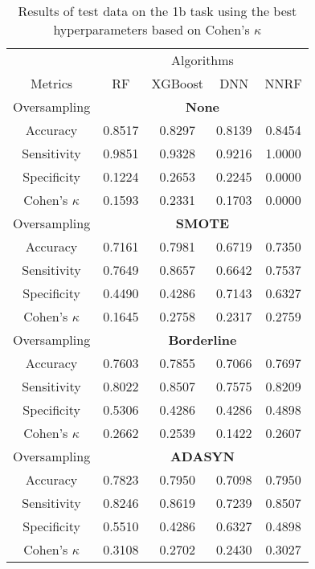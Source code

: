 \begin{table}[!htb]
\centering
\caption{Results of test data on the 1b task using the best hyperparameters based on Cohen's $\kappa$}
\label{tab:1b_test_results}
\begin{tabular}{c | c c c c}
\hline
 & \multicolumn{4}{c}{Algorithms}\\ 
Metrics &RF & XGBoost & DNN & NNRF\\ 
\hline
Oversampling &\multicolumn{4}{|c}{\textbf{None}}\\ 
\hline
Accuracy & 0.8517 & 0.8297 & 0.8139 & 0.8454\\ 
Sensitivity & 0.9851 & 0.9328 & 0.9216 & 1.0000\\ 
Specificity & 0.1224 & 0.2653 & 0.2245 & 0.0000\\ 
Cohen's $\kappa$ & 0.1593 & 0.2331 & 0.1703 & 0.0000\\ 
\hline
Oversampling &\multicolumn{4}{|c}{\textbf{SMOTE}}\\ 
\hline
Accuracy & 0.7161 & 0.7981 & 0.6719 & 0.7350\\ 
Sensitivity & 0.7649 & 0.8657 & 0.6642 & 0.7537\\ 
Specificity & 0.4490 & 0.4286 & 0.7143 & 0.6327\\ 
Cohen's $\kappa$ & 0.1645 & 0.2758 & 0.2317 & 0.2759\\ 
\hline
Oversampling &\multicolumn{4}{|c}{\textbf{Borderline}}\\ 
\hline
Accuracy & 0.7603 & 0.7855 & 0.7066 & 0.7697\\ 
Sensitivity & 0.8022 & 0.8507 & 0.7575 & 0.8209\\ 
Specificity & 0.5306 & 0.4286 & 0.4286 & 0.4898\\ 
Cohen's $\kappa$ & 0.2662 & 0.2539 & 0.1422 & 0.2607\\ 
\hline
Oversampling &\multicolumn{4}{|c}{\textbf{ADASYN}}\\ 
\hline
Accuracy & 0.7823 & 0.7950 & 0.7098 & 0.7950\\ 
Sensitivity & 0.8246 & 0.8619 & 0.7239 & 0.8507\\ 
Specificity & 0.5510 & 0.4286 & 0.6327 & 0.4898\\ 
Cohen's $\kappa$ & 0.3108 & 0.2702 & 0.2430 & 0.3027\\ 
\hline
\end{tabular}
\end{table}

